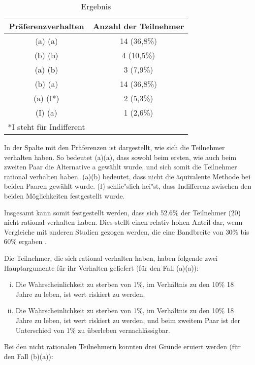\documentclass[11pt]{article}
\begin{document}
\begin{table}[!h]
  \centering
  \begin{tabular}{c c}
    \toprule
   \textbf{Präferenzverhalten}  & \textbf{Anzahl der Teilnehmer}\\ \midrule
    (a) (a) & 14 (36,8\%) \\ \midrule 
    (b) (b) & 4 (10,5\%) \\ \midrule
    (a) (b) & 3 (7,9\%) \\ \midrule
    (b) (a) & 14 (36,8\%) \\ \midrule
    (a) (I*) & 2 (5,3\%) \\ \midrule
    (I) (a) & 1 (2,6\%) \\ \bottomrule
    \tiny{*I steht f\"ur Indifferent}& \\\hline
  \end{tabular}
  \caption{Ergebnis}
  \label{tab:erg}
\end{table}
In der Spalte mit den Präferenzen ist dargestellt, wie sich die Teilnehmer verhalten haben. So bedeutet (a)(a), dass sowohl beim ersten, wie auch beim zweiten Paar die Alternative a gewählt wurde, und sich somit die Teilnehmer rational verhalten haben. (a)(b) bedeutet, dass nicht die äquivalente Methode bei beiden Paaren gewählt wurde. (I) schlie"slich hei"st, dass Indifferenz zwischen den beiden Möglichkeiten festgestellt wurde.

Insgesamt kann somit festgestellt werden, dass sich 52.6\% der Teilnehmer (20) nicht rational verhalten haben. Dies stellt einen relativ hohen Anteil dar, wenn Vergleiche mit anderen Studien gezogen werden, die eine Bandbreite von 30\% bis 60\% ergaben \parencites[siehe][]{borch1968allais}{raiffa1961risk}{savage1972foundations}.

Die Teilnehmer, die sich rational verhalten haben, haben folgende zwei Hauptargumente für ihr Verhalten geliefert (für den Fall (a)(a)):

\begin{enumerate}[i.]
\item Die Wahrscheinlichkeit zu sterben von 1\%, im Verhältnis zu den 10\% 18 Jahre zu leben, ist wert riskiert zu werden.
\item Die Wahrscheinlichkeit zu sterben von 1\%, im Verhältnis zu den 10\% 18 Jahre zu leben, ist wert riskiert zu werden, und beim zweitem Paar ist der Unterschied von 1\% zu überleben vernachlässigbar.
\end{enumerate}
\noindent  
Bei den nicht rationalen Teilnehmern konnten drei Gründe eruiert werden (für den Fall (b)(a)):
\end{document}
